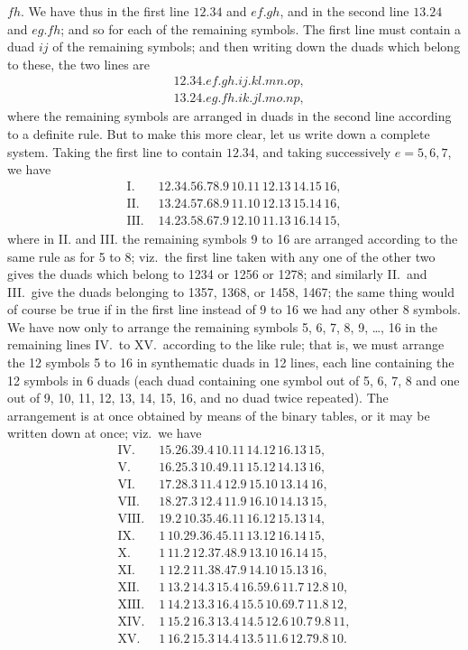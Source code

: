 \documentclass[11pt,a4paper,english]{article}
\theoremstyle{plain}
\begin{document}
\newpage
\noindent $fh$. We have thus in the first line $12.34$ and $ef.gh$, and in the second line $13.24$ and $eg.fh$; and so for each of the remaining symbols. The first line must contain a duad $ij$ of the remaining symbols; and then writing down the duads which belong to these, the two lines are
\begin{align*}
&12.34.ef.gh.ij.kl.mn.op, \\
&13.24.eg.fh.ik.jl.mo.np,
\end{align*}
where the remaining symbols are arranged in duads in the second line according to a definite rule. But to make this more clear, let us write down a complete system. Taking the first line to contain $12.34$, and taking successively $e = 5, 6, 7$, we have
\begin{align*}
\text{I. } &12.34.56.78.9\,10.11\,12.13\,14.15\,16, \\
\text{II. } &13.24.57.68.9\,11.10\,12.13\,15.14\,16, \\
\text{III. } &14.23.58.67.9\,12.10\,11.13\,16.14\,15,
\end{align*}
where in II. and III. the remaining symbols 9 to 16 are arranged according to the same rule as for 5 to 8; viz.\ the first line taken with any one of the other two gives the duads which belong to 1234 or 1256 or 1278; and similarly II.\ and III.\ give the duads belonging to 1357, 1368, or 1458, 1467; the same thing would of course be true if in the first line instead of 9 to 16 we had any other 8 symbols. We have now only to arrange the remaining symbols 5, 6, 7, 8, 9, \ldots, 16 in the remaining lines IV.\ to XV.\ according to the like rule; that is, we must arrange the 12 symbols 5 to 16 in synthematic duads in 12 lines, each line containing the 12 symbols in 6 duads (each duad containing one symbol out of 5, 6, 7, 8 and one out of 9, 10, 11, 12, 13, 14, 15, 16, and no duad twice repeated). The arrangement is at once obtained by means of the binary tables, or it may be written down at once; viz.\ we have
\begin{align*}
\text{IV. } &15.26.39.4\,10.11\,14.12\,16.13\,15, \\
\text{V. } &16.25.3\,10.49.11\,15.12\,14.13\,16, \\
\text{VI. } &17.28.3\,11.4\,12.9\,15.10\,13.14\,16, \\
\text{VII. } &18.27.3\,12.4\,11.9\,16.10\,14.13\,15, \\
\text{VIII. } &19.2\,10.35.46.11\,16.12\,15.13\,14, \\
\text{IX. } &1\,10.29.36.45.11\,13.12\,16.14\,15, \\
\text{X. } &1\,11.2\,12.37.48.9\,13.10\,16.14\,15, \\
\text{XI. } &1\,12.2\,11.38.47.9\,14.10\,15.13\,16, \\
\text{XII. } &1\,13.2\,14.3\,15.4\,16.59.6\,11.7\,12.8\,10, \\
\text{XIII. } &1\,14.2\,13.3\,16.4\,15.5\,10.69.7\,11.8\,12, \\
\text{XIV. } &1\,15.2\,16.3\,13.4\,14.5\,12.6\,10.7\,9.8\,11, \\
\text{XV. } &1\,16.2\,15.3\,14.4\,13.5\,11.6\,12.79.8\,10.
\end{align*}
\end{document}
